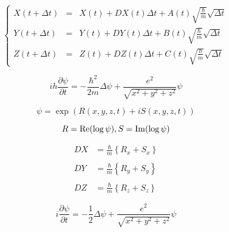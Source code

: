 $$
\left\{
\begin{array}{lll}
X(t+\varDelta t)&=&X(t)+DX(t)\varDelta t+A(t)\sqrt{\frac{\hbar}{m}}\sqrt{\varDelta t} \\
Y(t+\varDelta t)&=&Y(t)+DY(t)\varDelta t+B(t)\sqrt{\frac{\hbar}{m}}\sqrt{\varDelta t} \\
Z(t+\varDelta t)&=&Z(t)+DZ(t)\varDelta t+C(t)\sqrt{\frac{\hbar}{m}}\sqrt{\varDelta t}
\end{array}
\right.
$$

$$
i h \frac{\partial \psi}{\partial t}=-\frac{\hbar^2}{2m}\varDelta\psi+\frac{e^2}{\sqrt{x^2+y^2+z^2}}\psi
$$

$$
\psi=\exp(R(x,y,z,t)+iS(x,y,z,t))
$$

$$
R={\rm Re}(\log\psi), S={\rm Im}(\log\psi)
$$

$$
\begin{array}{ll}
DX&=\frac{\hbar}{m}\left\{R_{x}+S_{x}\right\} \\
\\
DY&=\frac{\hbar}{m}\left\{R_{y}+S_{y}\right\} \\
\\
DZ&=\frac{\hbar}{m}\left\{R_{z}+S_{z}\right\} 
\end{array}
$$

$$
i \frac{\partial \psi}{\partial t}=-\frac{1}{2}\varDelta\psi+\frac{e^2}{\sqrt{x^2+y^2+z^2}}\psi
$$